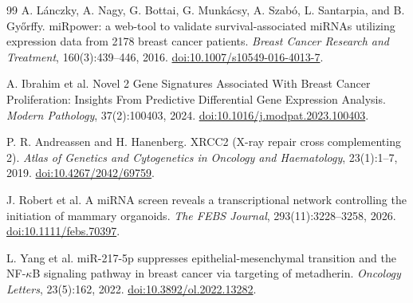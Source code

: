 \documentclass[11pt]{article}
\begin{document}
\begin{thebibliography}{99}
A. L\'anczky, A. Nagy, G. Bottai, G. Munk\'acsy, A. Szab\'o, L. Santarpia, and B. Gy\H{o}rffy.
miRpower: a web-tool to validate survival-associated miRNAs utilizing expression data from 2178 breast cancer patients.
\textit{Breast Cancer Research and Treatment}, 160(3):439--446, 2016.
\href{https://doi.org/10.1007/s10549-016-4013-7}{doi:10.1007/s10549-016-4013-7}.

A. Ibrahim et al.
Novel 2 Gene Signatures Associated With Breast Cancer Proliferation: Insights From Predictive Differential Gene Expression Analysis.
\textit{Modern Pathology}, 37(2):100403, 2024.
\href{https://doi.org/10.1016/j.modpat.2023.100403}{doi:10.1016/j.modpat.2023.100403}.

P. R. Andreassen and H. Hanenberg.
XRCC2 (X-ray repair cross complementing 2).
\textit{Atlas of Genetics and Cytogenetics in Oncology and Haematology}, 23(1):1--7, 2019.
\href{https://doi.org/10.4267/2042/69759}{doi:10.4267/2042/69759}.

J. Robert et al.
A miRNA screen reveals a transcriptional network controlling the initiation of mammary organoids.
\textit{The FEBS Journal}, 293(11):3228--3258, 2026.
\href{https://doi.org/10.1111/febs.70397}{doi:10.1111/febs.70397}.

L. Yang et al.
miR-217-5p suppresses epithelial-mesenchymal transition and the NF-$\kappa$B signaling pathway in breast cancer via targeting of metadherin.
\textit{Oncology Letters}, 23(5):162, 2022.
\href{https://doi.org/10.3892/ol.2022.13282}{doi:10.3892/ol.2022.13282}.

\end{thebibliography}
\end{document}
